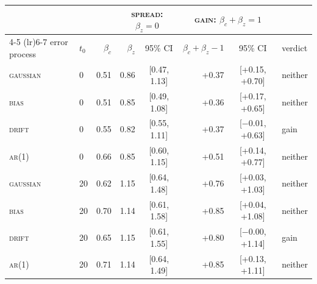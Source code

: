 \begin{tabular}{llrrcrcl}
\toprule
& & & \multicolumn{2}{c}{\textsc{spread}: $\beta_z = 0$} & \multicolumn{2}{c}{\textsc{gain}: $\beta_c + \beta_z = 1$} & \\
\cmidrule(lr){4-5} \cmidrule(lr){6-7}
error process & $t_0$ & $\beta_c$ & $\beta_z$ & 95\% CI & $\beta_c + \beta_z - 1$ & 95\% CI & verdict \\
\midrule
\textsc{gaussian} & 0 & 0.51 & 0.86 & [0.47, 1.13] & +0.37 & [+0.15, +0.70] & neither \\
\textsc{bias} & 0 & 0.51 & 0.85 & [0.49, 1.08] & +0.36 & [+0.17, +0.65] & neither \\
\textsc{drift} & 0 & 0.55 & 0.82 & [0.55, 1.11] & +0.37 & [$-$0.01, +0.63] & gain \\
\textsc{ar}(1) & 0 & 0.66 & 0.85 & [0.60, 1.15] & +0.51 & [+0.14, +0.77] & neither \\
\textsc{gaussian} & 20 & 0.62 & 1.15 & [0.64, 1.48] & +0.76 & [+0.03, +1.03] & neither \\
\textsc{bias} & 20 & 0.70 & 1.14 & [0.61, 1.58] & +0.85 & [+0.04, +1.08] & neither \\
\textsc{drift} & 20 & 0.65 & 1.15 & [0.61, 1.55] & +0.80 & [$-$0.00, +1.14] & gain \\
\textsc{ar}(1) & 20 & 0.71 & 1.14 & [0.64, 1.49] & +0.85 & [+0.13, +1.11] & neither \\
\bottomrule
\end{tabular}
